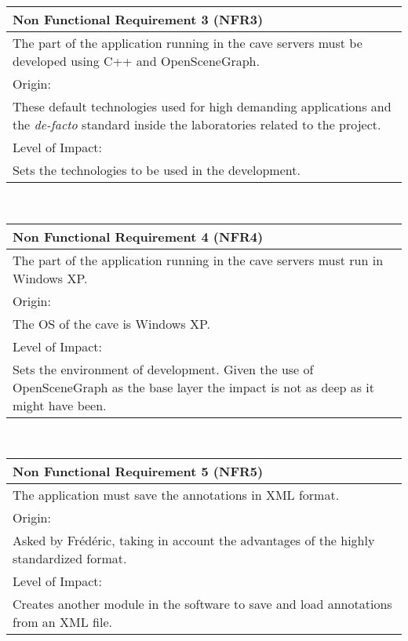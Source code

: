 \begin{center}
\begin{tabular}{p{12.6cm}}
	\hline
	{\Large Non Functional Requirement 3 (NFR3)}\\ \hline \hline
	The part of the application running in the cave servers must be developed using C++ and OpenSceneGraph. \\ \hline
	\large{Origin:}\\ \hline
	These default technologies used for high demanding applications and the \emph{de-facto} standard inside the laboratories related to the project.\\ \hline \hline
	\large{Level of Impact:}\\ \hline
	Sets the technologies to be used in the development.\\
	\hline
\end{tabular}\\
\vspace{10mm}

\begin{tabular}{p{12.6cm}}
	\hline
	{\Large Non Functional Requirement 4 (NFR4)}\\ \hline \hline
	The part of the application running in the cave servers must run in Windows XP. \\ \hline
	\large{Origin:}\\ \hline
	The OS of the cave is Windows XP.\\ \hline \hline
	\large{Level of Impact:}\\ \hline
	Sets the environment of development. Given the use of OpenSceneGraph as the base layer the impact is not as deep as it might have been.\\
	\hline
\end{tabular}\\
\vspace{10mm}

\begin{tabular}{p{12.6cm}}
	\hline
	{\Large Non Functional Requirement 5 (NFR5)}\\ \hline \hline
	The application must save the annotations in XML format. \\ \hline
	\large{Origin:}\\ \hline
	Asked by Frédéric, taking in account the advantages of the highly standardized format.\\ \hline \hline
	\large{Level of Impact:}\\ \hline
	Creates another module in the software to save and load annotations from an XML file.\\
	\hline
\end{tabular}\\
\vspace{10mm}



\end{center}
